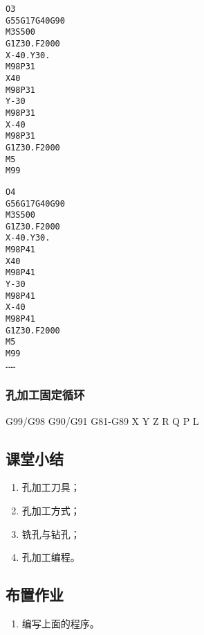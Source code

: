 \begin{lstlisting}
O3
G55G17G40G90
M3S500
G1Z30.F2000
X-40.Y30.
M98P31
X40
M98P31
Y-30
M98P31
X-40
M98P31
G1Z30.F2000
M5
M99
\end{lstlisting}

\begin{lstlisting}
O4
G56G17G40G90
M3S500
G1Z30.F2000
X-40.Y30.
M98P41
X40
M98P41
Y-30
M98P41
X-40
M98P41
G1Z30.F2000
M5
M99
……
\end{lstlisting}

\subsubsection{孔加工固定循环}

G99/G98 G90/G91 G81-G89 X Y Z R Q P L


\subsection{课堂小结}
\begin{enumerate}[1、]
\item 孔加工刀具；
\item 孔加工方式；
\item 铣孔与钻孔；
\item 孔加工编程。
\end{enumerate}

\vfill
\subsection{布置作业}
\begin{enumerate}[1、]
	\item 编写上面的程序。
\end{enumerate}
\vfill